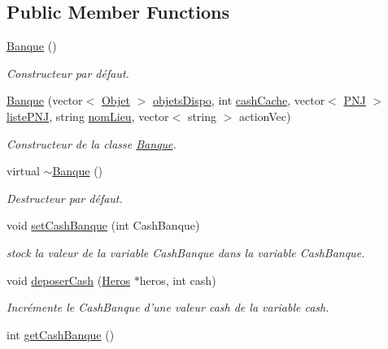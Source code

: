 \subsection*{Public Member Functions}
\begin{DoxyCompactItemize}
\item 
\hyperlink{class_banque_aa15f21fa24ac647319aee3f8beb4b7f8}{Banque} ()
\begin{DoxyCompactList}\small\item\em Constructeur par défaut. \end{DoxyCompactList}\item 
\hyperlink{class_banque_ad861c8a9604be0acd1340ce108451b63}{Banque} (vector$<$ \hyperlink{class_objet}{Objet} $>$ \hyperlink{class_lieu_a3a65fbb8ecba3f2e265905730ad2e631}{objets\-Dispo}, int \hyperlink{class_lieu_a90b76b521f92a43626ccd29ed5a29f89}{cash\-Cache}, vector$<$ \hyperlink{class_p_n_j}{P\-N\-J} $>$ \hyperlink{class_lieu_a8c1e20b105f7972f22d8f16651de4ebd}{liste\-P\-N\-J}, string \hyperlink{class_lieu_a1e48889fe5c581f043b8bd77ca497fc7}{nom\-Lieu}, vector$<$ string $>$ action\-Vec)
\begin{DoxyCompactList}\small\item\em Constructeur de la classe \hyperlink{class_banque}{Banque}. \end{DoxyCompactList}\item 
virtual \hyperlink{class_banque_a14aaf09b3db8037f8d0007958fa7def2}{$\sim$\-Banque} ()
\begin{DoxyCompactList}\small\item\em Destructeur par défaut. \end{DoxyCompactList}\item 
void \hyperlink{class_banque_a24f76bd9177ebdef767e6bcbdc491535}{set\-Cash\-Banque} (int Cash\-Banque)
\begin{DoxyCompactList}\small\item\em stock la valeur de la variable Cash\-Banque dans la variable Cash\-Banque. \end{DoxyCompactList}\item 
void \hyperlink{class_banque_a8b9265c9c4d5df37631054f88ccb5f60}{deposer\-Cash} (\hyperlink{class_heros}{Heros} $\ast$heros, int cash)
\begin{DoxyCompactList}\small\item\em Incrémente le Cash\-Banque d'une valeur cash de la variable cash. \end{DoxyCompactList}\item 
int \hyperlink{class_banque_afe8de2a23d1e568be91811734a749197}{get\-Cash\-Banque} ()

\end{DoxyCompactItemize}
